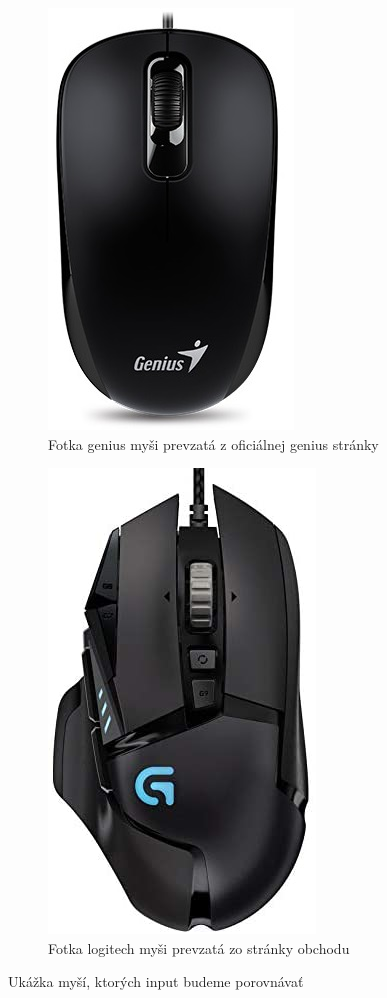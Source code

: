 \begin{figure}[!htb]
\centering
\begin{subfigure}{.5\textwidth}
  \centering
  \includegraphics[width=.4\linewidth]{img/genius_mys.jpg}
  \caption{Fotka genius myši prevzatá z oficiálnej genius stránky~\cite{genius_mouse_pic}}
  \label{obr:uvod:genius:mouse:pic}
\end{subfigure}%
\begin{subfigure}{.5\textwidth}
  \centering
  \includegraphics[width=.4\linewidth]{img/logitech_mys}
  \caption{Fotka logitech myši prevzatá zo stránky obchodu~\cite{logitech_mouse_pic}}
  \label{fig:sub2}
\end{subfigure}
\caption{Ukážka myší, ktorých input budeme porovnávať}
\label{obr:uvod:mysi:porovnanie}
\end{figure}

